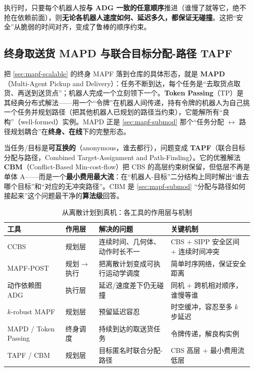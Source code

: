 \begin{theorem}\label{thm:mapf-adg}
执行时，只要每个机器人按\textbf{与 ADG 一致的任意顺序}推进（谁慢了就等它，绝不抢在依赖前面），则\textbf{无论各机器人速度如何、延迟多久，都保证无碰撞}\cite{honig2019persistent}。这把“安全”从脆弱的时间对齐，变成了鲁棒的顺序约束。
\end{theorem}

\subsection{终身取送货 MAPD 与联合目标分配-路径 TAPF}
\label{sec:mapf-mapd}

把 \cref{sec:mapf-scalable} 的终身 MAPF 落到仓库的具体形态，就是 \textbf{MAPD}（Multi-Agent Pickup and Delivery）：任务不断到达，每个任务是“去取货点取货、再送到送货点”；机器人完成一个立刻领下一个。\textbf{Token Passing}（TP）是其经典分布式解法——用一个“令牌”在机器人间传递，持有令牌的机器人为自己挑一个任务并规划路径（把其他机器人已规划的路径当约束），它能解所有“良构”（well-formed）实例\cite{ma2017lifelong}。MAPD 正是 \cref{sec:mapf-submod} 那个“任务分配 $\leftrightarrow$ 路径规划耦合”在\textbf{终身、在线}下的完整形态。

当任务/目标是\textbf{可互换的}（anonymous，谁去都行），问题变成 \textbf{TAPF}（联合目标分配与路径，Combined Target-Assignment and Path-Finding）。它的优雅解法 \textbf{CBM}（Conflict-Based Min-cost-flow）把 CBS 的高层约束树保留，但低层不再是单体 A\*——而是一个\textbf{最小费用最大流}：在“机器人-目标”二分结构上同时解出“谁去哪个目标”和“对应的无冲突路径”\cite{ma2016optimal}。CBM 是 \cref{sec:mapf-submod} “分配与路径如何接起来”这个问题最干净的\textbf{算法级}回答。

\begin{table}[H]\centering\small
\caption{从离散计划到真机：各工具的作用层与机制}
\label{tab:mapf-exec-tools}
\begin{tabular}{llll}
\toprule
工具 & 作用层 & 解决的问题 & 关键机制 \\
\midrule
CCBS & 规划层 & 连续时间、几何体、动作时长不一 & CBS $+$ SIPP 安全区间 $+$ 连续时间冲突 \\
MAPF-POST & 规划$\to$执行 & 把离散计划变成可执行运动学调度 & 简单时序网络，保证安全距离 \\
动作依赖图 ADG & 执行层 & 延迟/速度差下仍无碰撞 & 同机 $+$ 跨机相对顺序，谁慢等谁 \\
$k$-robust MAPF & 规划层 & 预留延迟容忍 & 时空缓冲，容忍至多 $k$ 步延迟 \\
MAPD / Token Passing & 终身调度 & 持续到达的取送货任务 & 令牌传递，解良构实例 \\
TAPF / CBM & 规划层 & 目标匿名时联合分配-路径 & CBS 高层 $+$ 最小费用流低层 \\
\bottomrule
\end{tabular}
\end{table}


